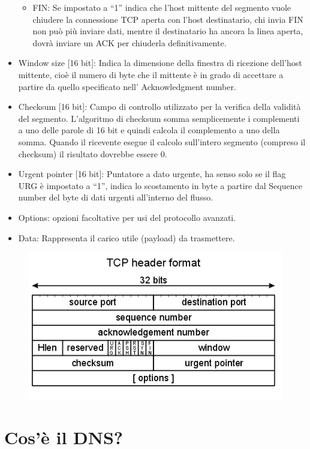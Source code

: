 \begin{itemize}
\begin{itemize}
\item	FIN: Se impostato a “1” indica che l’host mittente del segmento vuole chiudere la connessione TCP aperta con l’host destinatario, chi invia FIN non può più inviare dati, mentre il destinatario ha ancora la linea aperta, dovrà inviare un ACK per chiuderla definitivamente.
\end{itemize}
\item	Window size [16 bit]: Indica la dimensione della finestra di ricezione dell’host mittente, cioè il numero di byte che il mittente è in grado di accettare a partire da quello specificato nell’ Acknowledgment number.
\item	Checksum [16 bit]: Campo di controllo utilizzato per la verifica della validità del segmento. L’algoritmo di checksum somma semplicemente i complementi a uno delle parole di 16 bit e quindi calcola il complemento a uno della somma. Quando il ricevente esegue il calcolo sull’intero segmento (compreso il checksum) il risultato dovrebbe essere 0.
\item	Urgent pointer [16 bit]: Puntatore a dato urgente, ha senso solo se il flag URG è impostato a “1”, indica lo scostamento in byte a partire dal Sequence number del byte di dati urgenti all’interno del flusso.
\item	Options: opzioni facoltative per usi del protocollo avanzati.
\item	Data: Rappresenta il carico utile (payload) da trasmettere.
\end{itemize}

\begin{figure}[H]
\centering
\includegraphics[scale=0.6]{res/img/49_HeaderTCP.png}
\end{figure}

\section{Cos’è il DNS?}

